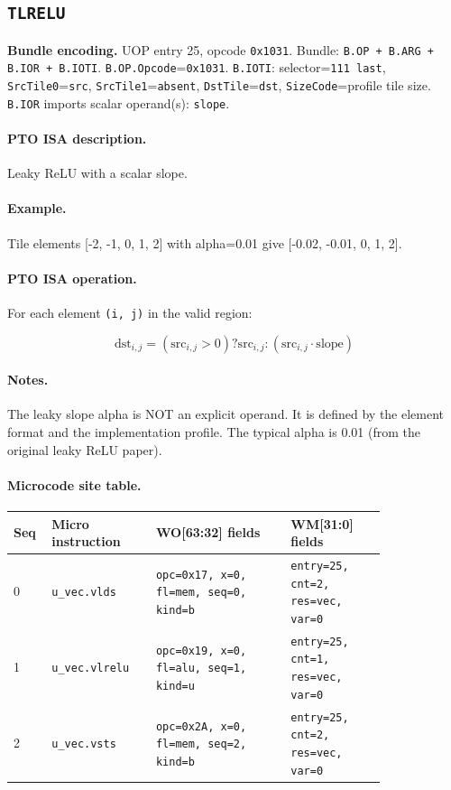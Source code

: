 \subsection{\texttt{TLRELU}}
\noindent\textbf{Bundle encoding.} UOP entry 25, opcode \texttt{0x1031}. Bundle: \texttt{B.OP + B.ARG + B.IOR + B.IOTI}. \texttt{B.OP.Opcode}=\texttt{0x1031}. \texttt{B.IOTI}: selector=\texttt{111 last}, \texttt{SrcTile0}=\texttt{src}, \texttt{SrcTile1}=\texttt{absent}, \texttt{DstTile}=\texttt{dst}, \texttt{SizeCode}=profile tile size. \texttt{B.IOR} imports scalar operand(s): \texttt{slope}.\par\smallskip
{\small
\paragraph{PTO ISA description.}
Leaky ReLU with a scalar slope.
\paragraph{Example.}
Tile elements [-2, -1, 0, 1, 2] with alpha=0.01 give [-0.02, -0.01, 0, 1, 2].
\par\smallskip
\paragraph{PTO ISA operation.}
For each element \texttt{(i, j)} in the valid region:

\[
\mathrm{dst}_{i,j} = (\mathrm{src}_{i,j} > 0) ? \mathrm{src}_{i,j} : (\mathrm{src}_{i,j} \cdot \mathrm{slope})
\]
}\par\smallskip
\paragraph{Notes.}
The leaky slope alpha is NOT an explicit operand. It is defined by the element format and the implementation profile. The typical alpha is 0.01 (from the original leaky ReLU paper).
\paragraph{Microcode site table.}
{\scriptsize
\begin{longtable}{@{}R{0.055\linewidth}L{0.23\linewidth}L{0.31\linewidth}L{0.22\linewidth}@{}}
\toprule
Seq & Micro instruction & WO[63:32] fields & WM[31:0] fields \\
 & \texttt{u\_vec.vlds} & \texttt{opc=0x17, x=0, fl=mem, seq=0, kind=b} & \texttt{entry=25, cnt=2, res=vec, var=0} \\
1 & \texttt{u\_vec.vlrelu} & \texttt{opc=0x19, x=0, fl=alu, seq=1, kind=u} & \texttt{entry=25, cnt=1, res=vec, var=0} \\
2 & \texttt{u\_vec.vsts} & \texttt{opc=0x2A, x=0, fl=mem, seq=2, kind=b} & \texttt{entry=25, cnt=2, res=vec, var=0} \\
\bottomrule
\end{longtable}
}
